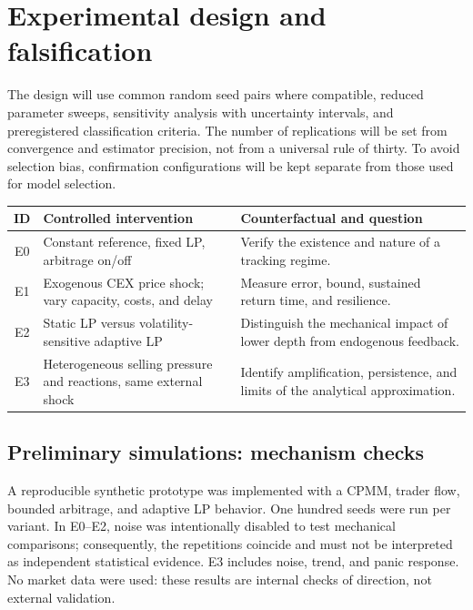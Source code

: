 \section{Experimental design and falsification}

The design will use common random seed pairs where compatible, reduced parameter
sweeps, sensitivity analysis with uncertainty intervals, and preregistered
classification criteria. The number of replications will be set from convergence and
estimator precision, not from a universal rule of thirty. To avoid selection bias,
confirmation configurations will be kept separate from those used for model selection.

\begin{table}[!ht]
\centering
\small
\begin{tabularx}{\textwidth}{@{}c p{4.2cm} X@{}}
\toprule
\textbf{ID} & \textbf{Controlled intervention} & \textbf{Counterfactual and question} \\
\midrule
E0 & Constant reference, fixed LP, arbitrage on/off & Verify the existence and nature
  of a tracking regime. \\
E1 & Exogenous CEX price shock; vary capacity, costs, and delay & Measure error, bound,
  sustained return time, and resilience. \\
E2 & Static LP versus volatility-sensitive adaptive LP & Distinguish the mechanical
  impact of lower depth from endogenous feedback. \\
E3 & Heterogeneous selling pressure and reactions, same external shock & Identify
  amplification, persistence, and limits of the analytical approximation. \\
\bottomrule
\end{tabularx}
\end{table}

\subsection{Preliminary simulations: mechanism checks}

A reproducible synthetic prototype was implemented with a CPMM, trader flow, bounded
arbitrage, and adaptive LP behavior. One hundred seeds were run per variant. In E0--E2,
noise was intentionally disabled to test mechanical comparisons; consequently, the
repetitions coincide and must not be interpreted as independent statistical evidence.
E3 includes noise, trend, and panic response. No market data were used: these results
are internal checks of direction, not external validation.

